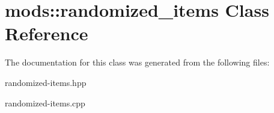 \hypertarget{classmods_1_1randomized__items}{}\section{mods\+:\+:randomized\+\_\+items Class Reference}
\label{classmods_1_1randomized__items}


The documentation for this class was generated from the following files\+:\begin{DoxyCompactItemize}
\item 
randomized-\/items.\+hpp\item 
randomized-\/items.\+cpp\end{DoxyCompactItemize}

